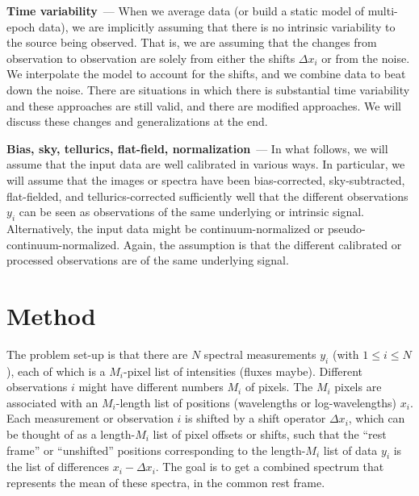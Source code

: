 \documentclass[11pt]{article}
\renewcommand{\paragraph}[1]{\medskip\par\noindent\textbf{#1}~---}
\begin{document}
\paragraph{Time variability}
When we average data (or build a static model of multi-epoch data), we are implicitly assuming that there is no intrinsic variability to the source being observed.
That is, we are assuming that the changes from observation to observation are solely from either the shifts $\Delta x_i$ or from the noise.
We interpolate the model to account for the shifts, and we combine data to beat down the noise.
There are situations in which there is substantial time variability and these approaches are still valid, and there are modified approaches.
We will discuss these changes and generalizations at the end.

\paragraph{Bias, sky, tellurics, flat-field, normalization}
In what follows, we will assume that the input data are well calibrated in various ways.
In particular, we will assume that the images or spectra have been bias-corrected, sky-subtracted, flat-fielded, and tellurics-corrected sufficiently well that the different observations $y_i$ can be seen as observations of the same underlying or intrinsic signal.
Alternatively, the input data might be continuum-normalized or pseudo-continuum-normalized.
Again, the assumption is that the different calibrated or processed observations are of the same underlying signal.

\section{Method}

The problem set-up is that there are $N$ spectral measurements $y_i$ (with $1\leq i\leq N$), each of which is a $M_i$-pixel list of intensities (fluxes maybe).
Different observations $i$ might have different numbers $M_i$ of pixels.
The $M_i$ pixels are associated with an $M_i$-length list of positions (wavelengths or log-wavelengths) $x_i$.
Each measurement or observation $i$ is shifted by a shift operator $\Delta x_i$, which can be thought of as a length-$M_i$ list of pixel offsets or shifts, such that the ``rest frame'' or ``unshifted'' positions corresponding to the length-$M_i$ list of data $y_i$ is the list of differences $x_i - \Delta x_i$.
The goal is to get a combined spectrum that represents the mean of these spectra, in the common rest frame.
\end{document}
